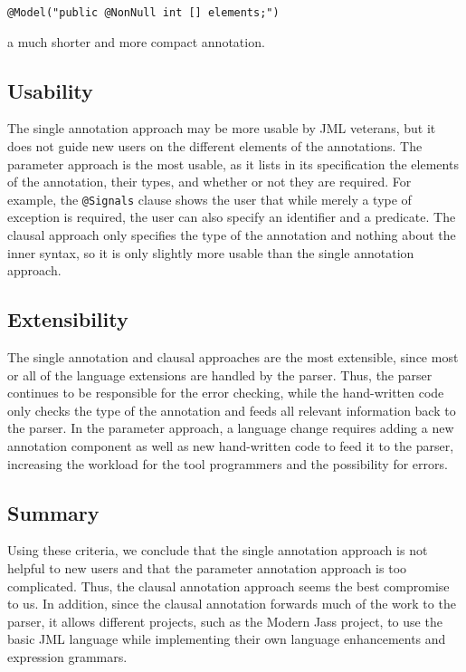 \documentclass{llncs}
\begin{document}
\begin{lstlisting}[language={[JML5]Java}]
@Model("public @NonNull int [] elements;")
\end{lstlisting}

\noindent a much shorter and more compact annotation.

\subsection{Usability}

The single annotation approach may be more usable by JML veterans, but it does not guide new users on the different elements of the annotations.  The parameter approach is the most usable, as it lists in its specification the elements of the annotation, their types, and whether or not they are required.  For example, the \lstinline[language={[JML5]Java}]{@Signals} clause shows the user that while merely a type of exception is required, the user can also specify an identifier and a predicate.  The clausal approach only specifies the type of the annotation and nothing about the inner syntax, so it is only slightly more usable than the single annotation approach.

\subsection{Extensibility}

The single annotation and clausal approaches are the most extensible, since most or all of the language extensions are handled by the parser.  Thus, the parser continues to be responsible for the error checking, while the hand-written code only checks the type of the annotation and feeds all relevant information back to the parser.  In the parameter approach, a language change requires adding a new annotation component as well as new hand-written code to feed it to the parser, increasing the workload for the tool programmers and the possibility for errors.

\subsection{Summary}

Using these criteria, we conclude that the single annotation approach is not helpful to new users and that the parameter annotation approach is too complicated.  Thus, the clausal annotation approach seems the best compromise to us.  In addition, since the clausal annotation forwards much of the work to the parser, it allows different projects, such as the Modern Jass project, to use the basic JML language while implementing their own language enhancements and expression grammars.
\end{document}
